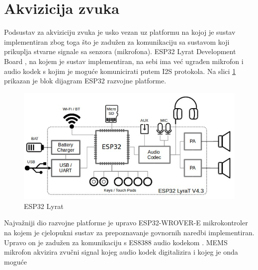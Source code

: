 \section{Akvizicija zvuka}

Podsustav za akviziciju zvuka je usko vezan uz platformu na kojoj
je sustav implementiran zbog toga što je zadužen za komunikaciju 
sa sustavom koji prikuplja stvarne signale sa senzora (mikrofona).
ESP32 Lyrat Development Board \cite{lyrat}, na kojem je sustav
implementiran, na sebi ima već ugrađen mikrofon i audio kodek
s kojim je moguće komunicirati putem I2S protokola. Na slici
\ref{pic:esp} prikazan je blok dijagram ESP32 razvojne platforme.

\begin{figure}[htb]
    \centering
    \includegraphics[width=0.6\linewidth]{Chapters/struktura_sustava/akvizicija/lyrat.png} 
    \caption{ESP32 Lyrat \cite{lyrat}}
    \label{pic:esp}
\end{figure}

Najvažniji dio razvojne platforme je upravo ESP32-WROVER-E mikrokontroler
na kojem je cjelopukni sustav za prepoznavanje govnornih naredbi 
implementiran. Upravo on je zadužen za komunikaciju s ES8388 
audio kodekom \cite{es8388}. MEMS mikrofon
akvizira zvučni signal kojeg audio kodek digitalizira i kojeg je onda
moguće 